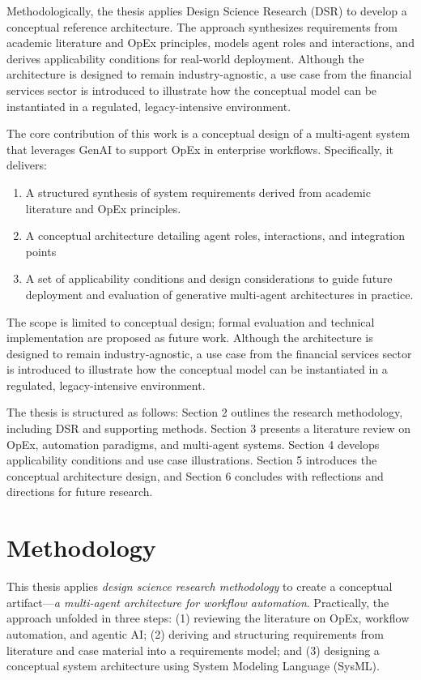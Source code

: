 Methodologically, the thesis applies Design Science Research (DSR) to develop a conceptual reference architecture. The approach synthesizes requirements from academic literature and OpEx principles, models agent roles and interactions, and derives applicability conditions for real-world deployment.
Although the architecture is designed to remain industry-agnostic, a use case from the financial services sector is introduced to illustrate how the conceptual model can be instantiated in a regulated, legacy-intensive environment.

The core contribution of this work is a conceptual design of a multi-agent system that leverages GenAI to support OpEx in enterprise workflows. Specifically, it delivers:
\begin{enumerate}
    \item A structured synthesis of system requirements derived from academic literature and OpEx principles.
    \item A conceptual architecture detailing agent roles, interactions, and integration points
    \item A set of applicability conditions and design considerations to guide future deployment and evaluation of generative multi-agent architectures in practice.
\end{enumerate}

The scope is limited to conceptual design; formal evaluation and technical implementation are proposed as future work. Although the architecture is designed to remain industry-agnostic, a use case from the financial services sector is introduced to illustrate how the conceptual model can be instantiated in a regulated, legacy-intensive environment.

The thesis is structured as follows: Section 2 outlines the research methodology, including DSR and supporting methods. Section 3 presents a literature review on OpEx, automation paradigms, and multi-agent systems. Section 4 develops applicability conditions and use case illustrations. Section 5 introduces the conceptual architecture design, and Section 6 concludes with reflections and directions for future research.

\section{Methodology}\label{sec:method}
This thesis applies \emph{design science research methodology} to create a conceptual artifact---\emph{a multi-agent architecture for workflow automation}. Practically, the approach unfolded in three steps: (1) reviewing the literature on OpEx, workflow automation, and agentic AI; (2) deriving and structuring requirements from literature and case material into a requirements model; and (3) designing a conceptual system architecture using System Modeling Language (SysML).

